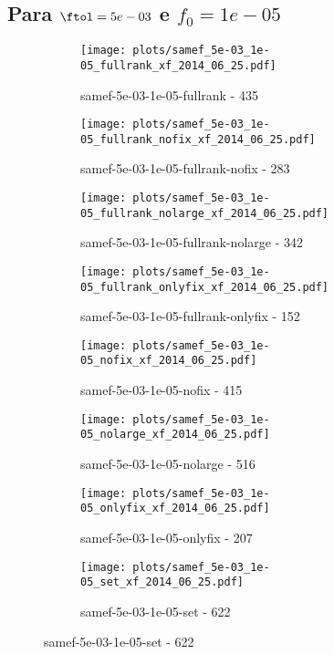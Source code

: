\newpage
\subsection{Para $\ftol = 5e-03$ e $f_0 = 1e-05$}

\begin{figure}[H]
  \centering
  \begin{subfigure}{0.48\textwidth}
    \texttt{[image: plots/samef\_5e-03\_1e-05\_fullrank\_xf\_2014\_06\_25.pdf]}
    \caption{samef-5e-03-1e-05-fullrank - 435}
  \end{subfigure}
  \begin{subfigure}{0.48\textwidth}
    \texttt{[image: plots/samef\_5e-03\_1e-05\_fullrank\_nofix\_xf\_2014\_06\_25.pdf]}
    \caption{samef-5e-03-1e-05-fullrank-nofix - 283}
  \end{subfigure}
  \begin{subfigure}{0.48\textwidth}
    \texttt{[image: plots/samef\_5e-03\_1e-05\_fullrank\_nolarge\_xf\_2014\_06\_25.pdf]}
    \caption{samef-5e-03-1e-05-fullrank-nolarge - 342}
  \end{subfigure}
  \begin{subfigure}{0.48\textwidth}
    \texttt{[image: plots/samef\_5e-03\_1e-05\_fullrank\_onlyfix\_xf\_2014\_06\_25.pdf]}
    \caption{samef-5e-03-1e-05-fullrank-onlyfix - 152}
  \end{subfigure}
  \begin{subfigure}{0.48\textwidth}
    \texttt{[image: plots/samef\_5e-03\_1e-05\_nofix\_xf\_2014\_06\_25.pdf]}
    \caption{samef-5e-03-1e-05-nofix - 415}
  \end{subfigure}
  \begin{subfigure}{0.48\textwidth}
    \texttt{[image: plots/samef\_5e-03\_1e-05\_nolarge\_xf\_2014\_06\_25.pdf]}
    \caption{samef-5e-03-1e-05-nolarge - 516}
  \end{subfigure}
  \begin{subfigure}{0.48\textwidth}
    \texttt{[image: plots/samef\_5e-03\_1e-05\_onlyfix\_xf\_2014\_06\_25.pdf]}
    \caption{samef-5e-03-1e-05-onlyfix - 207}
  \end{subfigure}
  \begin{subfigure}{0.48\textwidth}
    \texttt{[image: plots/samef\_5e-03\_1e-05\_set\_xf\_2014\_06\_25.pdf]}
    \caption{samef-5e-03-1e-05-set - 622}
  \end{subfigure}
\end{figure}

